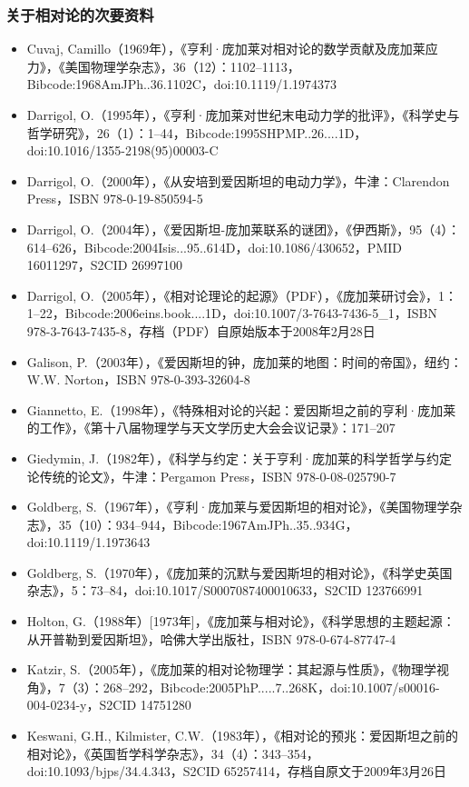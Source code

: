 \subsubsection{关于相对论的次要资料}  
\begin{itemize}
\item Cuvaj, Camillo（1969年），《亨利·庞加莱对相对论的数学贡献及庞加莱应力》，《美国物理学杂志》，36（12）：1102–1113，Bibcode:1968AmJPh..36.1102C，doi:10.1119/1.1974373  
\item Darrigol, O.（1995年），《亨利·庞加莱对世纪末电动力学的批评》，《科学史与哲学研究》，26（1）：1–44，Bibcode:1995SHPMP..26....1D，doi:10.1016/1355-2198(95)00003-C  
\item Darrigol, O.（2000年），《从安培到爱因斯坦的电动力学》，牛津：Clarendon Press，ISBN 978-0-19-850594-5  
\item Darrigol, O.（2004年），《爱因斯坦-庞加莱联系的谜团》，《伊西斯》，95（4）：614–626，Bibcode:2004Isis...95..614D，doi:10.1086/430652，PMID 16011297，S2CID 26997100  
\item Darrigol, O.（2005年），《相对论理论的起源》（PDF），《庞加莱研讨会》，1：1–22，Bibcode:2006eins.book....1D，doi:10.1007/3-7643-7436-5_1，ISBN 978-3-7643-7435-8，存档（PDF）自原始版本于2008年2月28日  
\item Galison, P.（2003年），《爱因斯坦的钟，庞加莱的地图：时间的帝国》，纽约：W.W. Norton，ISBN 978-0-393-32604-8  
\item Giannetto, E.（1998年），《特殊相对论的兴起：爱因斯坦之前的亨利·庞加莱的工作》，《第十八届物理学与天文学历史大会会议记录》：171–207  
\item Giedymin, J.（1982年），《科学与约定：关于亨利·庞加莱的科学哲学与约定论传统的论文》，牛津：Pergamon Press，ISBN 978-0-08-025790-7  
\item Goldberg, S.（1967年），《亨利·庞加莱与爱因斯坦的相对论》，《美国物理学杂志》，35（10）：934–944，Bibcode:1967AmJPh..35..934G，doi:10.1119/1.1973643  
\item Goldberg, S.（1970年），《庞加莱的沉默与爱因斯坦的相对论》，《科学史英国杂志》，5：73–84，doi:10.1017/S0007087400010633，S2CID 123766991  
\item Holton, G.（1988年）[1973年]，《庞加莱与相对论》，《科学思想的主题起源：从开普勒到爱因斯坦》，哈佛大学出版社，ISBN 978-0-674-87747-4
\item Katzir, S.（2005年），《庞加莱的相对论物理学：其起源与性质》，《物理学视角》，7（3）：268–292，Bibcode:2005PhP.....7..268K，doi:10.1007/s00016-004-0234-y，S2CID 14751280  
\item Keswani, G.H., Kilmister, C.W.（1983年），《相对论的预兆：爱因斯坦之前的相对论》，《英国哲学科学杂志》，34（4）：343–354，doi:10.1093/bjps/34.4.343，S2CID 65257414，存档自原文于2009年3月26日  

\end{itemize}
